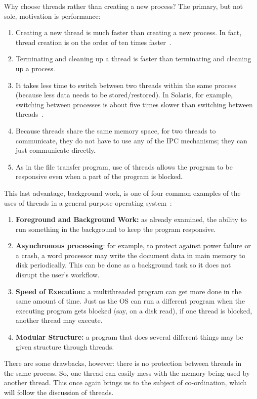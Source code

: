 \documentclass[a4paper]{report}
\begin{document}
Why choose threads rather than creating a new process? The primary, but not sole, motivation is performance:
\begin{enumerate}
	\item Creating a new thread is much faster than creating a new process. In fact, thread creation is on the order of ten times faster~\cite{machThreads}.
	\item Terminating and cleaning up a thread is faster than terminating and cleaning up a process.
	\item It takes less time to switch between two threads within the same process (because less data needs to be stored/restored). In Solaris, for example, switching between processes is about five times slower than switching between threads~\cite{osc}.
	\item Because threads share the same memory space, for two threads to communicate, they do not have to use any of the IPC mechanisms; they can just communicate directly.
	\item As in the file transfer program, use of threads allows the program to be responsive even when a part of the program is blocked.
\end{enumerate}

This last advantage, background work, is one of four common examples of the uses of threads in a general purpose operating system~\cite{insideOS2}:
\begin{enumerate}
	\item \textbf{Foreground and Background Work:} as already examined, the ability to run something in the background to keep the program responsive.
	\item \textbf{Asynchronous processing}: for example, to protect against power failure or a crash, a word processor may write the document data in main memory to disk periodically. This can be done as a background task so it does not disrupt the user's workflow.
	\item \textbf{Speed of Execution:} a multithreaded program can get more done in the same amount of time. Just as the OS can run a different program when the executing program gets blocked (say, on a disk read), if one thread is blocked, another thread may execute.
	\item \textbf{Modular Structure:} a program that does several different things may be given structure through threads.
\end{enumerate}

There are some drawbacks, however: there is no protection between threads in the same process. So, one thread can easily mess with the memory being used by another thread. This once again brings us to the subject of co-ordination, which will follow the discussion of threads.
\end{document}
